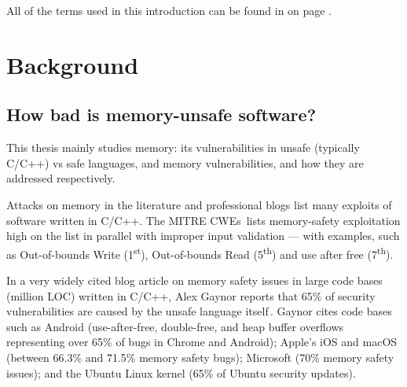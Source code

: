 \documentclass[nomenclature, english, bibtex]{kththesis}
\newcommand*{\generalExpl}[1]{\todo[inline]{#1}}
\begin{document}
All of the terms used in this introduction can be found in  on page \pageref{sec:introductiongloss}.

\section{Background}
\label{sec:background}


\subsection{How bad is memory-unsafe software?}
\label{sec:sizeOfProblem}



This thesis mainly studies memory: its vulnerabilities in unsafe (typically C/C++) vs safe languages, and memory vulnerabilities, and how they are addressed respectively.  

Attacks on memory in the literature and professional blogs list many exploits of software written in C/C++. The MITRE \glspl{CWE}\,\cite{noauthor_cwe_nodate} lists \gls{memory-safety} exploitation high on the list in parallel with improper input validation --- with examples, such as Out-of-bounds Write (1\textsuperscript{st}), Out-of-bounds Read (5\textsuperscript{th}) and use after free (7\textsuperscript{th}).

In a very widely cited blog article on memory safety issues in large code bases (million \gls{LOC}) written in C/C++, Alex Gaynor reports that 65\% of security vulnerabilities are caused by the unsafe language itself\,\cite{gaynor_what_2020}. Gaynor cites code bases such as Android (use-after-free, double-free, and heap buffer overflows representing over 65\% of bugs in Chrome and Android); Apple's iOS and macOS (between 66.3\% and 71.5\% memory safety bugs); Microsoft (70\%  memory safety issues); and the Ubuntu Linux kernel (65\% of Ubuntu security updates).
\end{document}
